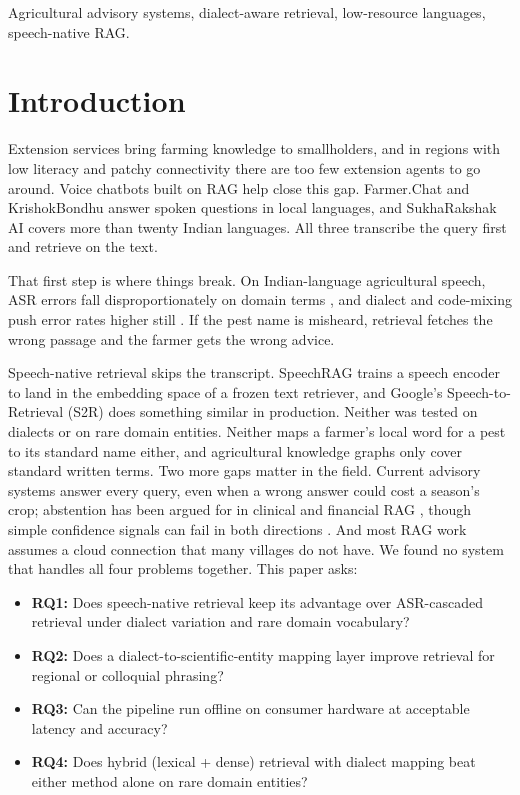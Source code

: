 \documentclass[conference]{IEEEtran}
\begin{document}
\renewcommand\IEEEkeywordsname{Keywords}
\begin{IEEEkeywords}
Agricultural advisory systems, dialect-aware retrieval, low-resource languages, speech-native RAG.
\end{IEEEkeywords}

\section{Introduction}
Extension services bring farming knowledge to smallholders, and in regions with low literacy and patchy connectivity there are too few extension agents to go around. Voice chatbots built on RAG help close this gap. Farmer.Chat \cite{farmerchat2024} and KrishokBondhu \cite{ameen2026krishokbondhu} answer spoken questions in local languages, and SukhaRakshak AI \cite{iwmi2025sukharakshak} covers more than twenty Indian languages. All three transcribe the query first and retrieve on the text.

That first step is where things break. On Indian-language agricultural speech, ASR errors fall disproportionately on domain terms \cite{benchmarkingasr2026}, and dialect and code-mixing push error rates higher still \cite{dialectmatters2026}. If the pest name is misheard, retrieval fetches the wrong passage and the farmer gets the wrong advice.

Speech-native retrieval skips the transcript. SpeechRAG \cite{min2025speechrag} trains a speech encoder to land in the embedding space of a frozen text retriever, and Google's Speech-to-Retrieval (S2R) \cite{google2025s2r} does something similar in production. Neither was tested on dialects or on rare domain entities. Neither maps a farmer's local word for a pest to its standard name either, and agricultural knowledge graphs \cite{wu2026cropgraphrag,kgeditorial2023} only cover standard written terms. Two more gaps matter in the field. Current advisory systems answer every query, even when a wrong answer could cost a season's crop; abstention has been argued for in clinical and financial RAG \cite{dependablerag2026,abstinence2025}, though simple confidence signals can fail in both directions \cite{intrygue2026}. And most RAG work assumes a cloud connection \cite{compactllm2026} that many villages do not have. We found no system that handles all four problems together. This paper asks:

\begin{itemize}
    \item \textbf{RQ1:} Does speech-native retrieval keep its advantage over ASR-cascaded retrieval under dialect variation and rare domain vocabulary?
    \item \textbf{RQ2:} Does a dialect-to-scientific-entity mapping layer improve retrieval for regional or colloquial phrasing?
    \item \textbf{RQ3:} Can the pipeline run offline on consumer hardware at acceptable latency and accuracy?
    \item \textbf{RQ4:} Does hybrid (lexical + dense) retrieval with dialect mapping beat either method alone on rare domain entities?
\end{itemize}
\end{document}

